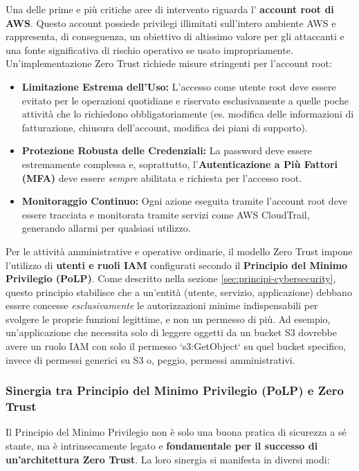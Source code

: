 \documentclass[a4paper,12pt]{report}
\begin{document}
Una delle prime e più critiche aree di intervento riguarda l' \textbf{account root di AWS}. Questo account possiede privilegi illimitati sull'intero ambiente AWS e rappresenta, di conseguenza, un obiettivo di altissimo valore per gli attaccanti e una fonte significativa di rischio operativo se usato impropriamente. Un'implementazione Zero Trust richiede misure stringenti per l'account root:
\begin{itemize}
    \item \textbf{Limitazione Estrema dell'Uso:} L'accesso come utente root deve essere evitato per le operazioni quotidiane e riservato esclusivamente a quelle poche attività che lo richiedono obbligatoriamente (es. modifica delle informazioni di fatturazione, chiusura dell'account, modifica dei piani di supporto).
    \item \textbf{Protezione Robusta delle Credenziali:} La password deve essere estremamente complessa e, soprattutto, l'\textbf{Autenticazione a Più Fattori (MFA)} deve essere \textit{sempre} abilitata e richiesta per l'accesso root.
    \item \textbf{Monitoraggio Continuo:} Ogni azione eseguita tramite l'account root deve essere tracciata e monitorata tramite servizi come AWS CloudTrail, generando allarmi per qualsiasi utilizzo.
\end{itemize}

Per le attività amministrative e operative ordinarie, il modello Zero Trust impone l'utilizzo di \textbf{utenti e ruoli IAM} configurati secondo il \textbf{Principio del Minimo Privilegio (PoLP)}. Come descritto nella sezione \ref{sec:principi-cybersecurity}, questo principio stabilisce che a un'entità (utente, servizio, applicazione) debbano essere concesse \textit{esclusivamente} le autorizzazioni minime indispensabili per svolgere le proprie funzioni legittime, e non un permesso di più. Ad esempio, un'applicazione che necessita solo di leggere oggetti da un bucket S3 dovrebbe avere un ruolo IAM con solo il permesso `s3:GetObject` su quel bucket specifico, invece di permessi generici su S3 o, peggio, permessi amministrativi.

\subsubsection{Sinergia tra Principio del Minimo Privilegio (PoLP) e Zero Trust}
\label{subsubsec:polp-zerotrust-correlation}

Il Principio del Minimo Privilegio non è solo una buona pratica di sicurezza a sé stante, ma è intrinsecamente legato e \textbf{fondamentale per il successo di un'architettura Zero Trust}. La loro sinergia si manifesta in diversi modi:
\end{document}
